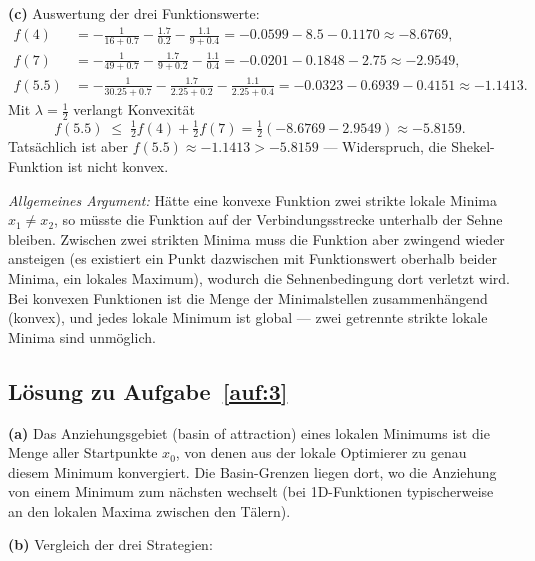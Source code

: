\documentclass[a4paper,11pt]{scrartcl}
\begin{document}
\textbf{(c)} Auswertung der drei Funktionswerte:
\begin{align*}
  f(4) &= -\frac{1}{16 + 0.7} - \frac{1.7}{0.2} - \frac{1.1}{9 + 0.4}
        = -0.0599 - 8.5 - 0.1170 \approx -8.6769,\\
  f(7) &= -\frac{1}{49 + 0.7} - \frac{1.7}{9 + 0.2} - \frac{1.1}{0.4}
        = -0.0201 - 0.1848 - 2.75 \approx -2.9549,\\
  f(5.5) &= -\frac{1}{30.25 + 0.7} - \frac{1.7}{2.25 + 0.2} - \frac{1.1}{2.25 + 0.4}
        = -0.0323 - 0.6939 - 0.4151 \approx -1.1413.
\end{align*}
Mit $\lambda = \tfrac12$ verlangt Konvexität
\[
  f(5.5) \;\leq\; \tfrac12 f(4) + \tfrac12 f(7) = \tfrac12(-8.6769 - 2.9549) \approx -5.8159.
\]
Tatsächlich ist aber $f(5.5) \approx -1.1413 > -5.8159$ --- Widerspruch, die
Shekel-Funktion ist nicht konvex.

\emph{Allgemeines Argument:} Hätte eine konvexe Funktion zwei strikte lokale Minima
$x_1 \neq x_2$, so müsste die Funktion auf der Verbindungsstrecke unterhalb der Sehne
bleiben. Zwischen zwei strikten Minima muss die Funktion aber zwingend wieder ansteigen
(es existiert ein Punkt dazwischen mit Funktionswert oberhalb beider Minima, ein lokales
Maximum), wodurch die Sehnenbedingung dort verletzt wird. Bei konvexen Funktionen ist die
Menge der Minimalstellen zusammenhängend (konvex), und jedes lokale Minimum ist global ---
zwei getrennte strikte lokale Minima sind unmöglich.

\subsection*{Lösung zu Aufgabe~\ref{auf:3}}

\textbf{(a)} Das Anziehungsgebiet (basin of attraction) eines lokalen Minimums ist die
Menge aller Startpunkte $x_0$, von denen aus der lokale Optimierer zu genau diesem
Minimum konvergiert. Die Basin-Grenzen liegen dort, wo die Anziehung von einem Minimum
zum nächsten wechselt (bei 1D-Funktionen typischerweise an den lokalen Maxima zwischen
den Tälern).

\textbf{(b)} Vergleich der drei Strategien:
\end{document}
